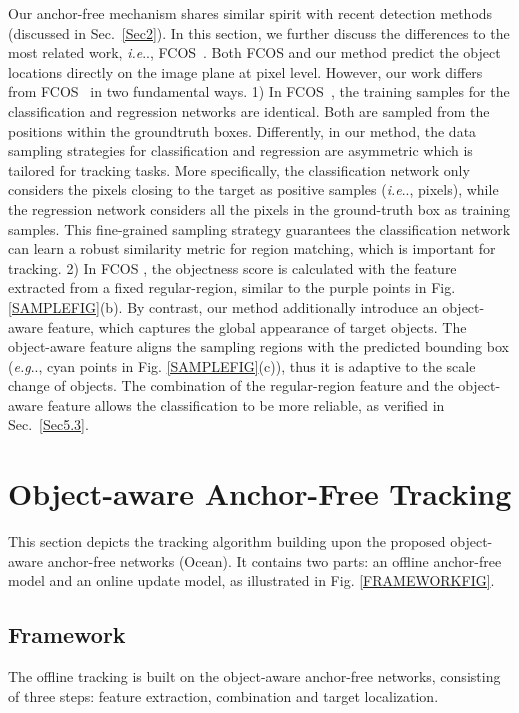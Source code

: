 \documentclass[runningheads]{llncs}
\makeatletter
\DeclareRobustCommand\onedot{\futurelet\@let@token\@onedot}
\def\@onedot{\ifx\@let@token.\else.\null\fi\xspace}
\def\eg{\emph{e.g}\onedot} \def\Eg{\emph{E.g}\onedot}
\def\ie{\emph{i.e}\onedot} \def\Ie{\emph{I.e}\onedot}
\makeatother
\begin{document}
Our anchor-free mechanism shares similar spirit with recent detection methods~\cite{CenterNet,CornerNet,FCOS} (discussed in Sec.~\ref{Sec2}). 
In this section, we further discuss the differences to the most related work, \ie, FCOS~\cite{FCOS}.
Both FCOS and our method predict the object locations directly on the image plane at pixel level. However, our work differs from FCOS~\cite{FCOS} in two fundamental ways.
1) In FCOS~\cite{FCOS}, the training samples for the classification and regression networks are identical. Both are sampled from the positions within the groundtruth boxes. Differently, in our method, the data sampling strategies for classification and regression are asymmetric 
which is tailored for tracking tasks. More specifically, the classification network only considers the pixels closing to the target as positive samples (\ie,  pixels), while the regression network considers all the pixels in the ground-truth box as training samples. This fine-grained sampling strategy guarantees the classification network can learn a robust similarity metric for region matching, which is important for tracking. 2) In FCOS \cite{FCOS}, the objectness score is calculated with the feature extracted from a fixed regular-region, similar to the purple points in Fig. \ref{SAMPLEFIG}(b). By contrast, our method additionally introduce an object-aware feature, which captures the global appearance of target objects. The object-aware feature aligns the sampling regions with the predicted bounding box (\eg, cyan points in Fig. \ref{SAMPLEFIG}(c)), thus it is adaptive to the scale change of objects. The combination of the regular-region feature and the object-aware feature allows the classification to be more reliable, as verified in Sec.~\ref{Sec5.3}.




\vspace{-1.3em}
\section{Object-aware Anchor-Free Tracking} \label{Sec4}
\vspace{-0.7em}
This section depicts the tracking algorithm building upon the proposed object-aware anchor-free networks (Ocean). It contains two  parts: an offline anchor-free model and an online update model, as illustrated in Fig. \ref{FRAMEWORKFIG}.


\vspace{-1.4em}
\subsection{Framework}
\vspace{-0.5em}
\label{Sec4.1}
The offline tracking is built on the object-aware anchor-free networks, consisting of three steps: feature extraction, combination and target localization.
\end{document}
